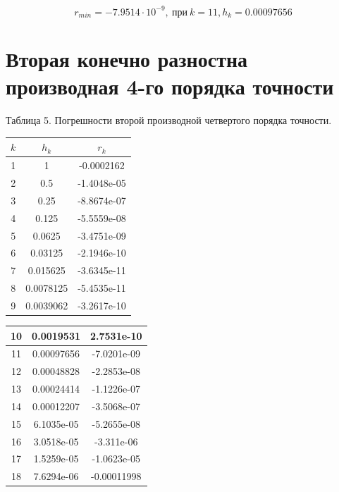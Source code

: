 \documentclass{article}
\begin{document}
	
	\[r_{min} = -7.9514\cdot 10^{-9},~ \text{при} ~ k=11, h_k=0.00097656\]
	
	\section{Вторая конечно разностна производная 4-го порядка точности}
	
	\begin{flushright}
		Таблица 5. Погрешности второй производной четвертого порядка точности.
	\end{flushright}
	
	\begin{table}[h!]
		\centering
		\begin{tabular}{|c|c|c|}
			
			\hline
			$k$  & $h_k$       & $r_k$        \\ \hline
			1  & 1          & -0.0002162  \\ \hline
			2  & 0.5        & -1.4048e-05 \\ \hline
			3  & 0.25       & -8.8674e-07 \\ \hline
			4  & 0.125      & -5.5559e-08 \\ \hline
			5  & 0.0625     & -3.4751e-09 \\ \hline
			6  & 0.03125    & -2.1946e-10 \\ \hline
			7  & 0.015625   & -3.6345e-11 \\ \hline
			8  & 0.0078125  & -5.4535e-11 \\ \hline
			9  & 0.0039062  & -3.2617e-10 \\ \hline
			
		\end{tabular}
	\end{table}
	
	\begin{table}[h!]
		\centering
		\begin{tabular}{|c|c|c|}
			\hline
			10 & 0.0019531  & 2.7531e-10  \\ \hline
			11 & 0.00097656 & -7.0201e-09 \\ \hline
			12 & 0.00048828 & -2.2853e-08 \\ \hline
			13 & 0.00024414 & -1.1226e-07 \\ \hline
			14 & 0.00012207 & -3.5068e-07 \\ \hline
			15 & 6.1035e-05 & -5.2655e-08 \\ \hline
			16 & 3.0518e-05 & -3.311e-06  \\ \hline
			17 & 1.5259e-05 & -1.0623e-05 \\ \hline
			18 & 7.6294e-06 & -0.00011998 \\ \hline
		\end{tabular}
	\end{table}
\end{document}
